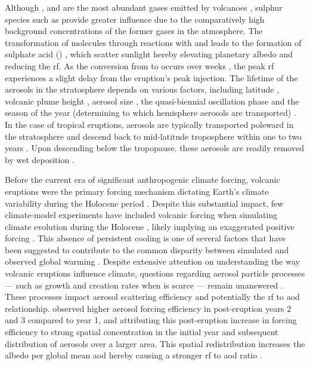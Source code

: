 \documentclass{ametsocV6.1}
\begin{document}
Although ,  and  are the most abundant gases emitted by volcanoes
\citep{robock2000}, sulphur species such as  provide greater influence due to
the comparatively high background concentrations of the former gases in the atmosphere.
The transformation of  molecules through reactions with  and 
leads to the formation of sulphate acid () \citep{robock2000}, which scatter
sunlight hereby elevating planetary albedo and reducing the \gls{rf}. As the conversion
from  to  occurs over weeks \citep{robock2000}, the peak \gls{rf}
experiences a slight delay from the eruption's peak  injection. The lifetime of
the  aerosols in the stratosphere depends on various factors, including
latitude \citep{marshall2019, toohey2019}, volcanic plume height \citep{marshall2019},
aerosol size \citep{marshall2019}, the quasi-biennial oscillation phase
\citep{pitari2016b} and the season of the year (determining to which hemisphere aerosols
are transported) \citep{toohey2011,toohey2019}. In the case of tropical eruptions,
aerosols are typically transported poleward in the stratosphere and descend back to
mid-latitude troposphere within one to two years \citep{robock2000}. Upon descending
below the tropopause, these aerosols are readily removed by wet deposition
\citep{liu2012}.

Before the current era of significant anthropogenic climate forcing, volcanic eruptions
were the primary forcing mechanism dictating Earth's climate variability during the
Holocene period \citep{sigl2022}. Despite this substantial impact, few climate-model
experiments have included volcanic forcing when simulating climate evolution during the
Holocene \citep{sigl2022}, likely implying an exaggerated positive forcing
\citep{gregory2016,solomon2011}. This absence of persistent cooling is one of several
factors that have been suggested to contribute to the common disparity between simulated
and observed global warming \citep{andersson2015}. Despite extensive attention on
understanding the way volcanic eruptions influence climate, questions regarding aerosol
particle processes --- such as growth and creation rates when  is scarce ---
remain unanswered \citep[e.g.,][]{robock2000,zanchettin2019,marshall2020,marshall2022}.
These processes impact aerosol scattering efficiency and potentially the \gls{rf} to
\gls{aod} relationship. \citet{marshall2020} observed higher aerosol forcing efficiency
in post-eruption years \(2\) and \(3\) compared to year 1, and attributing this
post-eruption increase in forcing efficiency to strong spatial concentration in the
initial year and subsequent distribution of aerosols over a larger area. This spatial
redistribution increases the albedo per global mean \gls{aod} hereby causing a stronger
\gls{rf} to \gls{aod} ratio \citep{marshall2020}.
\end{document}
